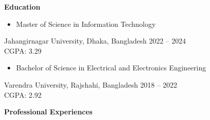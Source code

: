 \documentclass[a4paper,10pt]{article}
\begin{document}
\begin{tcolorbox}[colback=white, colframe=black, arc=3mm, boxrule=0.5mm, width=\textwidth]
    {\Large \textbf{Education}}
\end{tcolorbox}

\begin{flushleft}
    \begin{itemize}
    \item {Master of Science in Information Technology} \\ [0.5em]
    \end{itemize}
    \hspace{0.5in}
    {Jahangirnagar University, Dhaka, Bangladesh} \hfill {2022 -- 2024} \\ [0.5em]
    \hspace{0.7in} \hfill {CGPA: 3.29}

\end{flushleft}



\begin{flushleft}
    \begin{itemize}
    \item {Bachelor of Science in Electrical and Electronics Engineering} \\ [0.5em]
    \end{itemize}
    \hspace{0.5in}
    {Varendra University, Rajshahi, Bangladesh} \hfill { 2018 --  2022} \\ [0.5em]
    \hspace{0.7in} \hfill {CGPA: 2.92}
\end{flushleft}



\begin{tcolorbox}[colback=white, colframe=black, arc=3mm, boxrule=0.5mm, width=\textwidth]
    {\Large \textbf{Professional Experiences}}
\end{tcolorbox}
\end{document}
